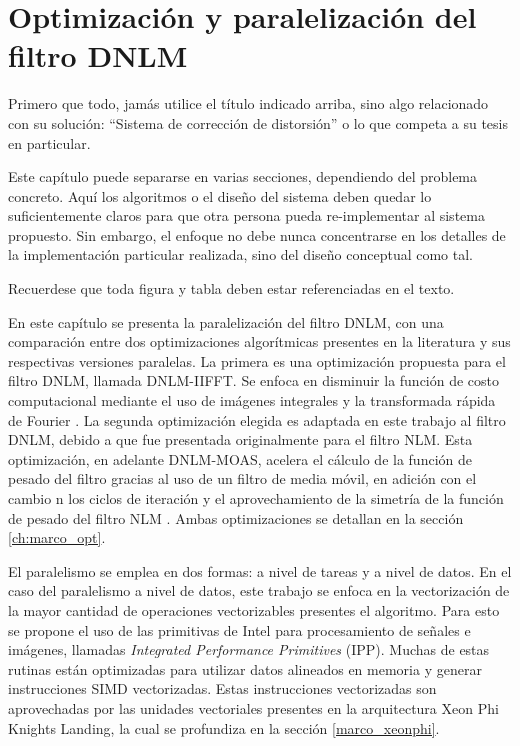 \chapter{Optimizaci\'on y paralelizaci\'on del filtro DNLM}
\label{ch:solucion}

Primero que todo, jamás utilice el título indicado arriba, sino algo
relacionado con su solución: ``Sistema de corrección de distorsión'' o lo que
competa a su tesis en particular.

Este capítulo puede separarse en varias secciones, dependiendo del problema
concreto. Aquí los algoritmos o el diseño del sistema deben quedar lo
suficientemente claros para que otra persona pueda re-implementar al sistema
propuesto. Sin embargo, el enfoque no debe nunca concentrarse en los detalles
de la implementación particular realizada, sino del diseño conceptual como tal.

Recuerdese que toda figura y tabla deben estar referenciadas en el texto.

En este cap\'itulo se presenta la paralelizaci\'on del filtro DNLM, con una comparaci\'on entre dos optimizaciones algor\'itmicas presentes en la literatura y sus respectivas versiones paralelas. La primera es una optimizaci\'on propuesta para el filtro DNLM, llamada DNLM-IIFFT. Se enfoca en disminuir la funci\'on de costo computacional mediante el uso de im\'agenes integrales y la transformada r\'apida de Fourier \cite{CalderonRamirez2017}. La segunda optimizaci\'on elegida es adaptada en este trabajo al filtro DNLM, debido a que fue presentada originalmente para el filtro NLM. Esta optimizaci\'on, en adelante DNLM-MOAS, acelera el c\'alculo de la funci\'on de pesado del filtro gracias al uso de un filtro de media m\'ovil, en adici\'on con el cambio n los ciclos de iteraci\'on y el aprovechamiento de la simetr\'ia de la funci\'on de pesado del filtro NLM \cite{Goossens2008}. Ambas optimizaciones se detallan en la secci\'on \ref{ch:marco_opt}.

El paralelismo se emplea en dos formas: a nivel de tareas y a nivel de datos. En el caso del paralelismo a nivel de datos, este trabajo se enfoca en la vectorizaci\'on de la mayor cantidad de operaciones vectorizables presentes el algoritmo. Para esto se propone el uso de las primitivas de Intel para procesamiento de se\~nales e im\'agenes, llamadas \textit{Integrated Performance Primitives} (IPP). Muchas de estas rutinas est\'an optimizadas para utilizar datos alineados en memoria y generar instrucciones SIMD vectorizadas. Estas instrucciones vectorizadas son aprovechadas por las unidades vectoriales presentes en la arquitectura Xeon Phi Knights Landing, la cual se profundiza en la secci\'on \ref{marco_xeonphi}.  
